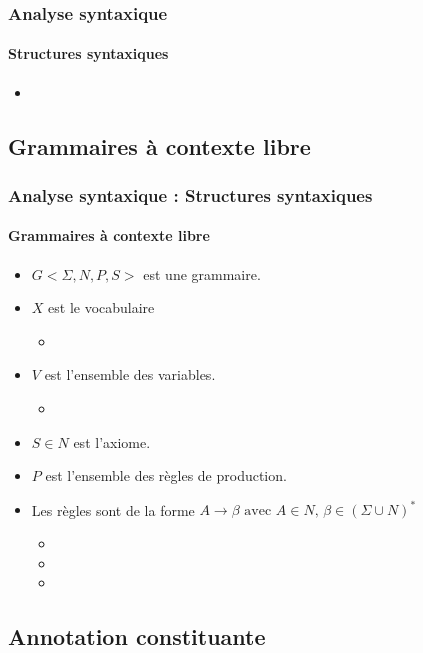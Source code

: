 \documentclass[xcolor=table]{beamer}
\begin{document}
\begin{frame}
\frametitle{Analyse syntaxique}
\framesubtitle{Structures syntaxiques}

\begin{itemize}
	\item 
\end{itemize}

\end{frame}

\subsection{Grammaires à contexte libre}

\begin{frame}
\frametitle{Analyse syntaxique : Structures syntaxiques}
\framesubtitle{Grammaires à contexte libre}

\begin{itemize}
	\item $G <\Sigma, N, P, S>$ est une grammaire.
	\item $X$ est le vocabulaire
	\begin{itemize}
		\item {}
	\end{itemize}
	\item $V$ est l'ensemble des  variables.
	\begin{itemize}
		\item {}
	\end{itemize}
	\item $S \in N$ est l'axiome.
	\item $P$ est l'ensemble des règles de production.
	\item Les règles sont de la forme $A \rightarrow \beta \text{ avec } A \in N,\, \beta \in (\Sigma \cup N)^*$
	\begin{itemize}
		\item {}
		\item {}
		\item {}
	\end{itemize}
\end{itemize}

\end{frame}

\subsection{Annotation constituante}
\end{document}
